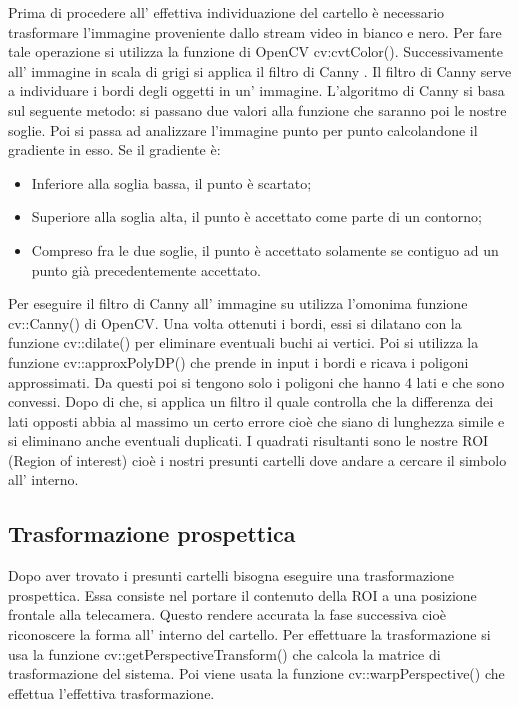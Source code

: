 	Prima di procedere all' effettiva individuazione del cartello è necessario trasformare l'immagine proveniente dallo stream video in bianco e nero. Per fare tale operazione si utilizza la funzione di OpenCV cv:cvtColor(). Successivamente all' immagine  in scala di grigi si applica il filtro di Canny \cite{canny}. Il filtro di Canny serve a individuare i bordi degli oggetti in un' immagine. L'algoritmo di Canny si basa sul seguente metodo: si passano due valori alla funzione che saranno poi le nostre soglie. Poi si passa ad analizzare l'immagine punto per punto calcolandone il gradiente in esso. Se il gradiente è:
	\begin{itemize}
		\item Inferiore alla soglia bassa, il punto è scartato;
		\item Superiore alla soglia alta, il punto è accettato come parte di un contorno;
		\item Compreso fra le due soglie, il punto è accettato solamente se contiguo ad un punto già precedentemente accettato.
	\end{itemize}
	Per eseguire il filtro di Canny all' immagine su utilizza l'omonima funzione cv::Canny() di OpenCV. Una volta ottenuti i bordi, essi si dilatano con la funzione cv::dilate() per eliminare eventuali buchi ai vertici. Poi si utilizza la funzione cv::approxPolyDP() che prende in input i bordi e ricava i poligoni approssimati. Da questi poi si tengono solo i poligoni che hanno 4 lati e che sono convessi. Dopo di che, si applica un filtro il quale controlla che la differenza dei lati opposti abbia al massimo un certo errore cioè che siano di lunghezza simile e si eliminano anche eventuali duplicati. I quadrati risultanti sono le nostre ROI (Region of interest) cioè i nostri presunti cartelli dove andare a cercare il simbolo all' interno.

\subsection{Trasformazione prospettica}

	Dopo aver trovato i presunti cartelli bisogna eseguire una trasformazione prospettica. Essa consiste nel portare il contenuto della ROI a una posizione frontale alla telecamera. Questo rendere accurata la fase successiva cioè riconoscere la forma all' interno del cartello. Per effettuare la trasformazione si usa la funzione cv::getPerspectiveTransform() che calcola la matrice di trasformazione del sistema. Poi viene usata la funzione cv::warpPerspective() che effettua l'effettiva trasformazione.


